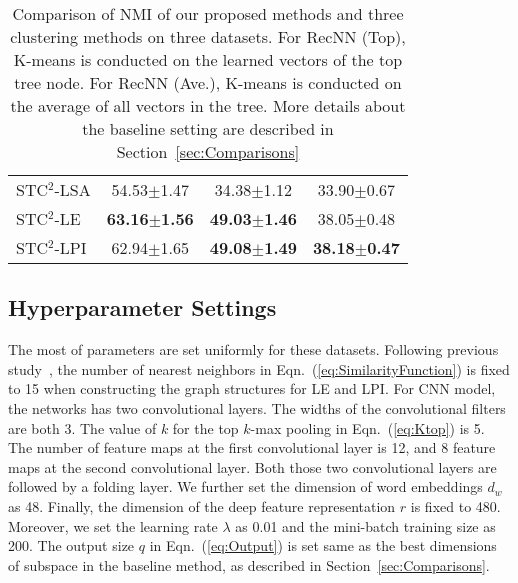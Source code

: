 \documentclass[review]{elsarticle}
\begin{document}
\begin{table*}[t]
\begin{center}
\begin{tabular}{|l|c|c|c|}
STC$^2$-LSA&	54.53$\pm$1.47	& 34.38$\pm$1.12   &33.90$\pm$0.67\\
STC$^2$-LE&	{\bf{63.16$\pm$1.56}}	& {\bf{49.03$\pm$1.46}}  &38.05$\pm$0.48\\
STC$^2$-LPI&	62.94$\pm$1.65	& {\bf{49.08$\pm$1.49}} &{\bf{38.18$\pm$0.47}}\\\hline

\end{tabular}
\end{center}
\caption{\label{tb:ComparisonNMI} Comparison of NMI of our proposed methods and three clustering methods on three datasets. For RecNN (Top), K-means is conducted on the learned vectors of the top tree node. For RecNN (Ave.), K-means is conducted on the average of all vectors in the tree. More details about the baseline setting are described in Section~\ref{sec:Comparisons}}
\end{table*}

\subsection{Hyperparameter Settings}
The most of parameters are set uniformly for these datasets. Following previous study~\cite{4_cai2005document}, the number of nearest neighbors in Eqn.~(\ref{eq:SimilarityFunction}) is fixed to 15 when constructing the graph structures for LE and LPI. For CNN model, the networks has two convolutional layers. The widths of the convolutional filters are both 3. The value of \(k\) for the top \(k\)-max pooling in Eqn.~(\ref{eq:Ktop}) is 5. The number of feature maps at the first convolutional layer is 12, and 8 feature maps at the second convolutional layer. Both those two convolutional layers are followed by a folding layer. We further set the dimension of word embeddings \({d_w}\) as 48. Finally, the dimension of the deep feature representation \(r\) is fixed to 480. Moreover, we set the learning rate \(\lambda \) as 0.01 and the mini-batch training size as 200. The output size \(q\) in Eqn.~(\ref{eq:Output}) is set same as the best dimensions of subspace in the baseline method, as described in Section~\ref{sec:Comparisons}.
\end{document}
